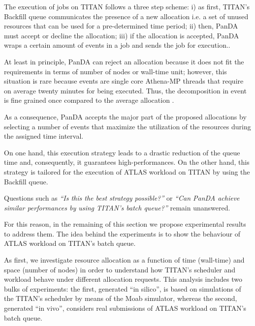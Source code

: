 The execution of jobs on TITAN follows a three step scheme: i) as first, TITAN's Backfill queue communicates the presence of a new allocation i.e. a set of unused resources that can be used for a pre-determined time period; ii) then, PanDA must accept or decline the allocation; iii) if the allocation is accepted, PanDA wraps a certain amount of events in a job and sends the job for execution..

At least in principle, PanDA can reject an allocation because it does not fit the requirements in terms of number of nodes or wall-time unit; however, this situation is rare because events are single core Athena-MP threads that require on average twenty minutes for being executed. Thus, the decomposition in event is fine grained once compared to the average allocation .

As a consequence, PanDA accepts the major part of the proposed allocations by selecting a number of events that maximize the utilization of the resources during the assigned time interval.

On one hand, this execution strategy leads to a drastic reduction of the queue time and, consequently, it guarantees high-performances. On the other hand, this strategy is tailored for the execution of ATLAS workload on TITAN by using the Backfill queue.

Questions such as \emph{``Is this the best strategy possible?''} or \emph{``Can PanDA achieve similar performances by using TITAN's batch queue?''}  remain unanswered.

For this reason, in the remaining of this section we propose experimental results to address them. The idea behind the experiments is to show the behaviour of ATLAS workload on TITAN's batch queue.

As first, we investigate resource allocation as a function of time (wall-time) and space (number of nodes) in order to understand how TITAN's scheduler and workload behave under different allocation requests. This analysis includes two bulks of experiments: the first, generated ``in silico'', is based on simulations of the TITAN's scheduler by means of the Moab simulator, whereas the second, generated ``in vivo'',  considers real submissions of ATLAS workload on TITAN's batch queue.

